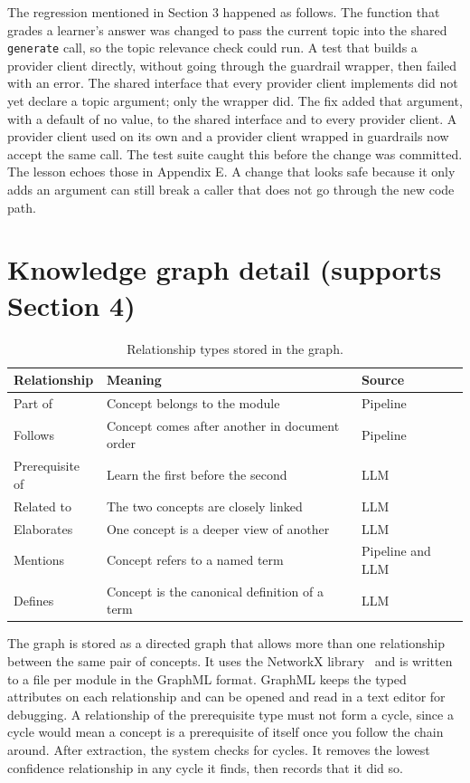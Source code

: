 \documentclass{ecai}
\begin{document}
The regression mentioned in Section 3 happened as follows. The function that
grades a learner's answer was changed to pass the current topic into the
shared \texttt{generate} call, so the topic relevance check could run. A test
that builds a provider client directly, without going through the guardrail
wrapper, then failed with an error. The shared interface that every provider
client implements did not yet declare a topic argument; only the wrapper did.
The fix added that argument, with a default of no value, to the shared
interface and to every provider client. A provider client used on its own and a
provider client wrapped in guardrails now accept the same call. The test suite
caught this before the change was committed. The lesson echoes those in
Appendix E. A
change that looks safe because it only adds an argument can still break a caller
that does not go through the new code path.

\section{Knowledge graph detail (supports Section 4)}

\begin{table}[h]
\caption{Relationship types stored in the graph.}
\label{tab:kg-edges}
\centering
\small
\begin{tabular}{p{2.0cm}p{2.7cm}p{1.0cm}}
\toprule
\textbf{Relationship} & \textbf{Meaning} & \textbf{Source} \\
\midrule
Part of & Concept belongs to the module & Pipeline \\
Follows & Concept comes after another in document order & Pipeline \\
Prerequisite of & Learn the first before the second & LLM \\
Related to & The two concepts are closely linked & LLM \\
Elaborates & One concept is a deeper view of another & LLM \\
Mentions & Concept refers to a named term & Pipeline and LLM \\
Defines & Concept is the canonical definition of a term & LLM \\
\bottomrule
\end{tabular}
\end{table}

The graph is stored as a directed graph that allows more than one relationship
between the same pair of concepts. It uses the NetworkX
library~\cite{hagberg2008exploring} and is written to a file per module in the
GraphML format. GraphML keeps the typed attributes on each relationship and can
be opened and read in a text editor for debugging.
A relationship of the prerequisite type must not form a cycle, since a cycle
would mean a concept is a prerequisite of itself once you follow the chain
around. After extraction, the system checks for cycles. It removes the lowest
confidence relationship in any cycle it finds, then records that it did so.
\end{document}
